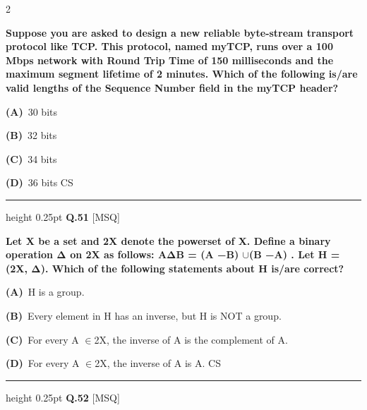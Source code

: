 \documentclass[a4paper,10pt,twoside]{article}
\begin{document}
\begin{multicols}{2}
\par\vspace{2pt}
{\bfseries Suppose you are asked to design a new reliable byte-stream transport protocol
like TCP. This protocol, named myTCP, runs over a 100 Mbps network with Round
Trip Time of 150 milliseconds and the maximum segment lifetime of 2 minutes.
Which of the following is/are valid lengths of the Sequence Number ﬁeld in the
myTCP header? \par}
\par\vspace{2pt}\noindent
\textbf{(A)}~30 bits\par\vspace{2pt}\noindent
\textbf{(B)}~32 bits\par\vspace{2pt}\noindent
\textbf{(C)}~34 bits\par\vspace{2pt}\noindent
\textbf{(D)}~36 bits \newline CS
\par\vspace{6pt}\hrule height 0.25pt\vspace{6pt}
\noindent\textbf{Q.51} \hfill {\footnotesize\textsf{[MSQ]}}
\par\vspace{2pt}
{\bfseries Let X be a set and 2X denote the powerset of X.
Deﬁne a binary operation Δ on 2X as follows:
AΔB = (A −B) $\cup$(B −A) .
Let H = (2X, Δ). Which of the following statements about H is/are correct? \par}
\par\vspace{2pt}\noindent
\textbf{(A)}~H is a group.\par\vspace{2pt}\noindent
\textbf{(B)}~Every element in H has an inverse, but H is NOT a group.\par\vspace{2pt}\noindent
\textbf{(C)}~For every A $\in$2X, the inverse of A is the complement of A.\par\vspace{2pt}\noindent
\textbf{(D)}~For every A $\in$2X, the inverse of A is A. \newline CS
\par\vspace{6pt}\hrule height 0.25pt\vspace{6pt}
\noindent\textbf{Q.52} \hfill {\footnotesize\textsf{[MSQ]}}
\par\vspace{2pt}

\end{multicols}
\end{document}
